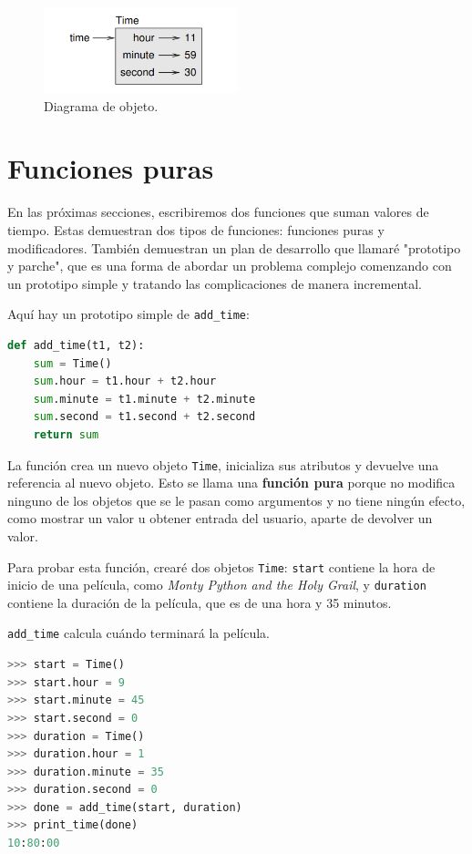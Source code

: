 \begin{figure}[h]
\centering
\includegraphics[width=0.5\textwidth]{./images/chapter_16_1.png}
\caption{Diagrama de objeto.}
\label{fig:time_diagram}
\end{figure}

\section{Funciones puras}

En las próximas secciones, escribiremos dos funciones que suman valores de tiempo. Estas demuestran dos tipos de funciones: funciones puras y modificadores. También demuestran un plan de desarrollo que llamaré "prototipo y parche", que es una forma de abordar un problema complejo comenzando con un prototipo simple y tratando las complicaciones de manera incremental.

Aquí hay un prototipo simple de \texttt{add\_time}:

\begin{lstlisting}[language=Python]
def add_time(t1, t2):
    sum = Time()
    sum.hour = t1.hour + t2.hour
    sum.minute = t1.minute + t2.minute
    sum.second = t1.second + t2.second
    return sum
\end{lstlisting}

La función crea un nuevo objeto \texttt{Time}, inicializa sus atributos y devuelve una referencia al nuevo objeto. Esto se llama una \textbf{función pura} porque no modifica ninguno de los objetos que se le pasan como argumentos y no tiene ningún efecto, como mostrar un valor u obtener entrada del usuario, aparte de devolver un valor.

Para probar esta función, crearé dos objetos \texttt{Time}: \texttt{start} contiene la hora de inicio de una película, como \textit{Monty Python and the Holy Grail}, y \texttt{duration} contiene la duración de la película, que es de una hora y 35 minutos.

\texttt{add\_time} calcula cuándo terminará la película.

\begin{lstlisting}[language=Python]
>>> start = Time()
>>> start.hour = 9
>>> start.minute = 45
>>> start.second = 0
>>> duration = Time()
>>> duration.hour = 1
>>> duration.minute = 35
>>> duration.second = 0
>>> done = add_time(start, duration)
>>> print_time(done)
10:80:00
\end{lstlisting}

